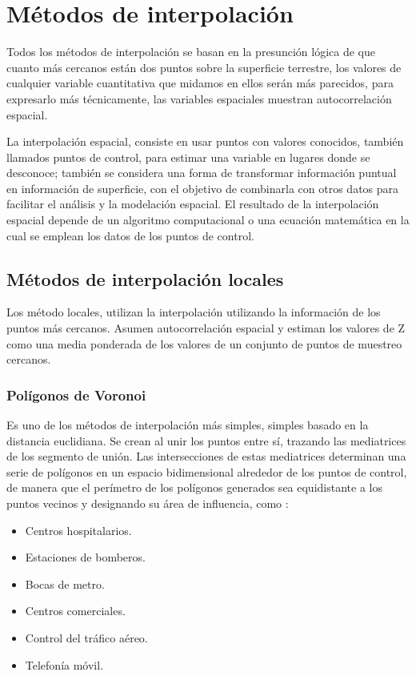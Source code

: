 \section{Métodos de interpolación}
\label{sec:cap2-metodos-interpolacion}
Todos los métodos de interpolación se basan en la presunción lógica de que
cuanto más cercanos están dos puntos sobre la superficie terrestre, los
valores de cualquier variable cuantitativa que midamos en ellos serán más
parecidos, para expresarlo más técnicamente, las variables espaciales
muestran autocorrelación espacial\cite{fAlonsoSig2006}.

La interpolación espacial, consiste en usar puntos con valores conocidos,
también llamados puntos de control, para estimar una variable en lugares
donde se desconoce; también se considera una forma de transformar información
puntual en información de superficie, con el objetivo de combinarla con
otros datos para facilitar el análisis y la modelación espacial.
El resultado de la interpolación espacial depende de un algoritmo
computacional o una ecuación matemática en la cual se emplean los datos
de los puntos de control\cite{NINO2011}.

\subsection{Métodos de interpolación locales}
Los método locales, utilizan la interpolación utilizando la información
de los puntos más cercanos. Asumen autocorrelación espacial y estiman los
valores de Z como una media ponderada de los valores de un conjunto de
puntos de muestreo cercanos\cite{fAlonsoSig2006}.

\subsubsection{Polígonos de Voronoi}
Es uno de los métodos de interpolación más simples, simples basado en la
distancia euclidiana. Se crean al unir los puntos entre sí, trazando las
mediatrices de los segmento de unión. Las intersecciones de estas mediatrices
determinan una serie de polígonos en un espacio bidimensional alrededor de
los puntos de control, de manera que el perímetro de los polígonos generados
sea equidistante a los puntos vecinos y designando su área de influencia, como :
\begin{itemize}
    \item Centros hospitalarios.
    \item Estaciones de bomberos.
    \item Bocas de metro.
    \item Centros comerciales.
    \item Control del tráfico aéreo.
    \item Telefonía móvil.
\end{itemize}

